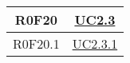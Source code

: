 \documentclass[../AnalisiDeiRequisiti.tex]{subfiles}
\begin{document}
\begin{longtable}{|c|c|}
	R0F20 & \hyperlink{UC2.3}{UC2.3}\\\hline
	R0F20.1 & \hyperlink{UC2.3.1}{UC2.3.1}\\\hline

\end{longtable}
\end{document}
